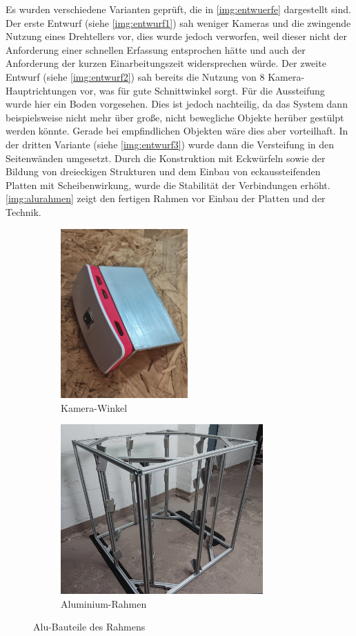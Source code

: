 \documentclass[./00PhotoBox.tex]{subfiles}
\begin{document}
Es wurden verschiedene Varianten geprüft, die in \autoref{img:entwuerfe} dargestellt sind. Der erste Entwurf (siehe \autoref{img:entwurf1}) sah weniger Kameras und die zwingende Nutzung eines Drehtellers vor, dies wurde jedoch verworfen, weil dieser nicht der Anforderung einer schnellen Erfassung entsprochen hätte und auch der Anforderung der kurzen Einarbeitungszeit widersprechen würde. Der zweite Entwurf (siehe \autoref{img:entwurf2}) sah bereits die Nutzung von 8 Kamera-Hauptrichtungen vor, was für gute Schnittwinkel sorgt. Für die Aussteifung wurde hier ein Boden vorgesehen. Dies ist jedoch nachteilig, da das System dann beispielsweise nicht mehr über große, nicht bewegliche Objekte herüber gestülpt werden könnte. Gerade bei empfindlichen Objekten wäre dies aber vorteilhaft. In der dritten Variante (siehe \autoref{img:entwurf3}) wurde dann die Versteifung in den Seitenwänden umgesetzt. Durch die Konstruktion mit Eckwürfeln sowie der Bildung von dreieckigen Strukturen und dem Einbau von eckaussteifenden Platten mit Scheibenwirkung, wurde die Stabilität der Verbindungen erhöht. \autoref{img:alurahmen} zeigt den fertigen Rahmen vor Einbau der Platten und der Technik.


\begin{figure}
    \centering
    \begin{subfigure}{0.38\textwidth}
        \includegraphics[height=6.5cm]{./img/3_aufbau/aluwinkel.jpg}
        \centering
        \caption{Kamera-Winkel}
        \label{img:aluwinkel}
    \end{subfigure}
    \begin{subfigure}{0.58\textwidth}
        \includegraphics[height=6.5cm]{./img/3_aufbau/alurahmen.jpg}
        \centering
        \caption{Aluminium-Rahmen}
        \label{img:alurahmen} %
    \end{subfigure}
    \caption{Alu-Bauteile des Rahmens}
\end{figure}
\end{document}
